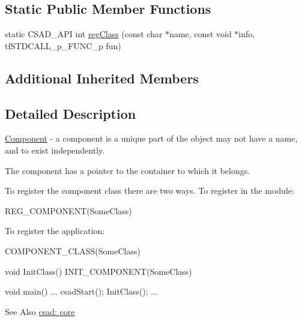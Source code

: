 \subsection*{Static Public Member Functions}
\begin{DoxyCompactItemize}
\item 
static C\-S\-A\-D\-\_\-\-A\-P\-I int \hyperlink{classcsad_1_1_component_ac36baa797370264fac2a0dca02eb00d8}{reg\-Class} (const char $\ast$name, const void $\ast$info, tf\-S\-T\-D\-C\-A\-L\-L\-\_\-p\-\_\-\-F\-U\-N\-C\-\_\-p fun)
\end{DoxyCompactItemize}
\subsection*{Additional Inherited Members}


\subsection{Detailed Description}
\hyperlink{classcsad_1_1_component}{Component} -\/ a component is a unique part of the object may not have a name, and to exist independently. 

The component has a pointer to the container to which it belongs.

To register the component class there are two ways. To register in the module\-: \begin{DoxyVerb}  REG_COMPONENT(SomeClass)
\end{DoxyVerb}


To register the application\-: \begin{DoxyVerb}  COMPONENT_CLASS(SomeClass)

  void InitClass()
  {
     INIT_COMPONENT(SomeClass)
  }

  void main()
  {
     ...
     csadStart();
     InitClass();
     ...
  }
\end{DoxyVerb}


\begin{DoxySeeAlso}{See Also}
\hyperlink{group__core}{csad\-: core} 
\end{DoxySeeAlso}


